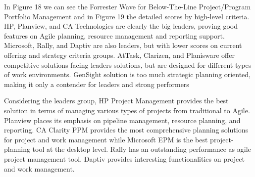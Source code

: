 In Figure 18 we can see the Forrester Wave for Below-The-Line Project/Program Portfolio Management and in Figure 19 the detailed scores by high-level criteria. HP, Planview, and CA Technologies are clearly the big leaders, proving good features on Agile planning, resource management and reporting support. Microsoft, Rally, and Daptiv are also leaders, but with lower scores on current offering and strategy criteria groups. AtTask, Clarizen, and Planisware offer competitive solutions facing leaders solutions, but are designed for different types of work environments. GenSight solution is too much strategic planning oriented, making it only a contender for leaders and strong performers\par
Considering the leaders group, HP Project Management provides the best solution in terms of managing various types of projects from traditional to Agile. Planview places its emphasis on pipeline management, resource planning, and reporting. CA Clarity PPM provides the most comprehensive planning solutions for project and work management while Microsoft EPM is the best project-planning tool at the desktop level. Rally has an outstanding performance as agile project management tool. Daptiv provides interesting functionalities on project and work management.\par

